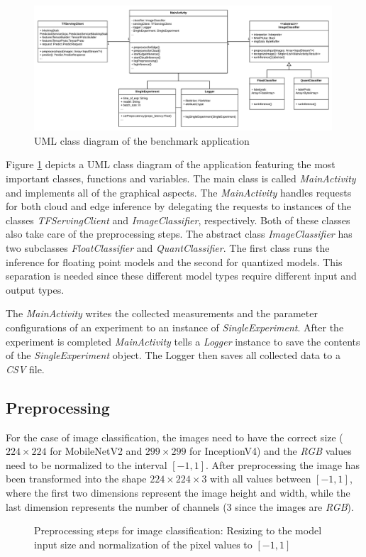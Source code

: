 \begin{figure}[htb]
\centering
\includegraphics[width=0.99\textwidth]{./Bilder/UML.pdf}
\caption{UML class diagram of the benchmark application}
\label{fig:UML}
\end{figure}
Figure \ref{fig:UML} depicts a UML class diagram of the application featuring the most important classes, functions and variables. 
The main class is called \emph{MainActivity} and implements all of the graphical aspects. 
The \emph{MainActivity} handles requests for both cloud and edge inference by delegating the requests to instances of the classes \emph{TFServingClient} and \emph{ImageClassifier}, respectively. Both of these classes also take care of the preprocessing steps.
The abstract class \emph{ImageClassifier} has two subclasses \emph{FloatClassifier} and \emph{QuantClassifier}. The first class runs the inference for floating point models and the second for quantized models.
This separation is needed since these different model types require different input and output types.

The \emph{MainActivity} writes the collected measurements and the parameter configurations of an experiment to an instance of \emph{SingleExperiment}. After the experiment is completed \emph{MainActivity} tells a \emph{Logger} instance to save the contents of the \emph{SingleExperiment} object. The Logger then saves all collected data to a \emph{CSV} file.

\subsection{Preprocessing}
For the case of image classification, the images need to have the correct size ($224\times224$ for MobileNetV2 and $299\times299$ for InceptionV4) and the \emph{RGB} values need to be normalized to the interval $[-1,1]$. After preprocessing the image has been transformed into the shape $224\times224\times3$ with all values between $[-1,1]$, where the first two dimensions represent the image height and width, while the last dimension represents the number of channels (3 since the images are \emph{RGB}).
\begin{figure}[!htb]
\centering

\caption{Preprocessing steps for image classification: Resizing to the model input size and normalization of the pixel values to $[-1,1]$}
\label{fig:prepro}
\end{figure}
